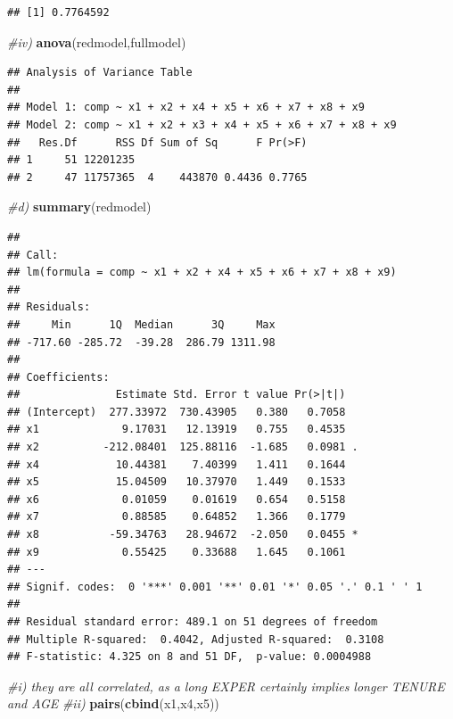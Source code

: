 \documentclass[
]{article}
\newenvironment{Shaded}{\begin{snugshade}}{\end{snugshade}}
\newcommand{\CommentTok}[1]{\textcolor[rgb]{0.56,0.35,0.01}{\textit{#1}}}
\newcommand{\FunctionTok}[1]{\textcolor[rgb]{0.13,0.29,0.53}{\textbf{#1}}}
\newcommand{\NormalTok}[1]{#1}
\begin{document}
\begin{verbatim}
## [1] 0.7764592
\end{verbatim}

\begin{Shaded}
\begin{Highlighting}[]
\CommentTok{\#iv)}
\FunctionTok{anova}\NormalTok{(redmodel,fullmodel)}
\end{Highlighting}
\end{Shaded}

\begin{verbatim}
## Analysis of Variance Table
## 
## Model 1: comp ~ x1 + x2 + x4 + x5 + x6 + x7 + x8 + x9
## Model 2: comp ~ x1 + x2 + x3 + x4 + x5 + x6 + x7 + x8 + x9
##   Res.Df      RSS Df Sum of Sq      F Pr(>F)
## 1     51 12201235                           
## 2     47 11757365  4    443870 0.4436 0.7765
\end{verbatim}

\begin{Shaded}
\begin{Highlighting}[]
\CommentTok{\#d)}
\FunctionTok{summary}\NormalTok{(redmodel)}
\end{Highlighting}
\end{Shaded}

\begin{verbatim}
## 
## Call:
## lm(formula = comp ~ x1 + x2 + x4 + x5 + x6 + x7 + x8 + x9)
## 
## Residuals:
##     Min      1Q  Median      3Q     Max 
## -717.60 -285.72  -39.28  286.79 1311.98 
## 
## Coefficients:
##               Estimate Std. Error t value Pr(>|t|)  
## (Intercept)  277.33972  730.43905   0.380   0.7058  
## x1             9.17031   12.13919   0.755   0.4535  
## x2          -212.08401  125.88116  -1.685   0.0981 .
## x4            10.44381    7.40399   1.411   0.1644  
## x5            15.04509   10.37970   1.449   0.1533  
## x6             0.01059    0.01619   0.654   0.5158  
## x7             0.88585    0.64852   1.366   0.1779  
## x8           -59.34763   28.94672  -2.050   0.0455 *
## x9             0.55425    0.33688   1.645   0.1061  
## ---
## Signif. codes:  0 '***' 0.001 '**' 0.01 '*' 0.05 '.' 0.1 ' ' 1
## 
## Residual standard error: 489.1 on 51 degrees of freedom
## Multiple R-squared:  0.4042, Adjusted R-squared:  0.3108 
## F-statistic: 4.325 on 8 and 51 DF,  p-value: 0.0004988
\end{verbatim}

\begin{Shaded}
\begin{Highlighting}[]
\CommentTok{\#i) they are all correlated, as a long EXPER certainly implies longer TENURE and AGE}
\CommentTok{\#ii) }
\FunctionTok{pairs}\NormalTok{(}\FunctionTok{cbind}\NormalTok{(x1,x4,x5))}
\end{Highlighting}
\end{Shaded}
\end{document}
